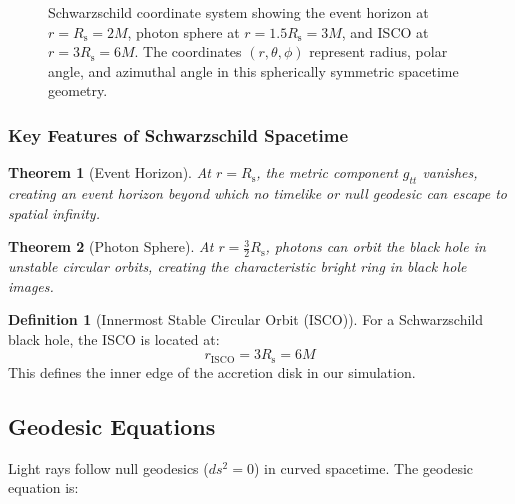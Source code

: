 \documentclass[12pt,a4paper]{article}
\newtheorem{theorem}{Theorem}[section]
\theoremstyle{definition}
\newtheorem{definition}{Definition}[section]
\theoremstyle{remark}
\newcommand{\Rs}{R_{\text{s}}}
\newcommand{\ISCO}{\text{ISCO}}
\begin{document}
\begin{figure}[H]
    \caption{Schwarzschild coordinate system showing the event horizon at $r = \Rs = 2M$, photon sphere at $r = 1.5\Rs = 3M$, and ISCO at $r = 3\Rs = 6M$. The coordinates $(r, \theta, \phi)$ represent radius, polar angle, and azimuthal angle in this spherically symmetric spacetime geometry.}
    \label{fig:schwarzschild_coords}
\end{figure}

\subsubsection{Key Features of Schwarzschild Spacetime}

\begin{theorem}[Event Horizon]
At $r = \Rs$, the metric component $g_{tt}$ vanishes, creating an event horizon beyond which no timelike or null geodesic can escape to spatial infinity.
\end{theorem}

\begin{theorem}[Photon Sphere]
At $r = \frac{3}{2}\Rs$, photons can orbit the black hole in unstable circular orbits, creating the characteristic bright ring in black hole images.
\end{theorem}

\begin{definition}[Innermost Stable Circular Orbit (ISCO)]
For a Schwarzschild black hole, the ISCO is located at:
\begin{equation}
    r_{\ISCO} = 3\Rs = 6M
\end{equation}
This defines the inner edge of the accretion disk in our simulation.
\end{definition}

\subsection{Geodesic Equations}

Light rays follow null geodesics ($ds^2 = 0$) in curved spacetime. The geodesic equation is:
\end{document}
